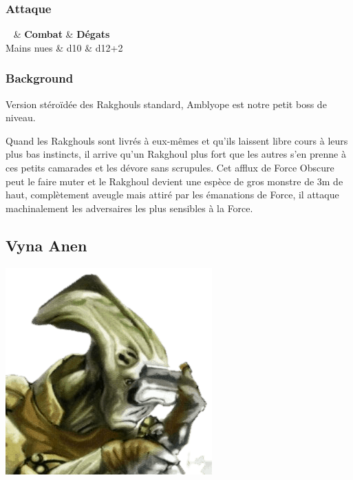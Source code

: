 \subsubsection{Attaque}
\begin{itemtable}[ X c c ]
	~ 			& \textbf{Combat} 	& \textbf{Dégats} \\
	Mains nues	& d10 				& d12+2 
\end{itemtable}

\newpage
\subsubsection{Background}
Version stéroïdée des Rakghouls standard, Amblyope est notre petit boss de niveau.

Quand les Rakghouls sont livrés à eux-mêmes et qu’ils laissent libre cours à leurs plus bas instincts, il arrive qu’un Rakghoul plus fort que les autres s’en prenne à ces petits camarades et les dévore sans scrupules. Cet afflux de Force Obscure peut le faire muter et le Rakghoul devient une espèce de gros monstre de 3m de haut, complètement aveugle mais attiré par les émanations de Force, il attaque machinalement les adversaires les plus sensibles à la Force. 

\clearpage
\subsection{Vyna Anen}
\noindent\includegraphics[width=\linewidth]{_img/dos-au-muur/vyna-anen.png}

